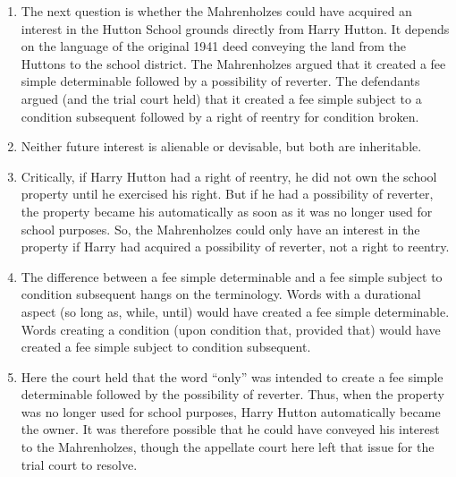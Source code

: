 \begin{enumerate}
    school board is in dispute. It depends on how the court interprets the 
    language in the conveyance. But the only two possible future interests 
    that could have been created are (1) a possibility of reverter or (2) a 
    right of reentry. Neither of these future interests are transferable 
    inter vivos under Illinois law, so ``the trial court correctly ruled that 
    the plaintiffs could not have acquired any interest in that property from 
    the Jacqmains by the deed of October 9, 1959.''\footnote{Casebook p. 227.}
    \item The next question is whether the Mahrenholzes could have acquired an 
    interest in the Hutton School grounds directly from Harry Hutton. It 
    depends on the language of the original 1941 deed conveying the land from 
    the Huttons to the school district. The Mahrenholzes argued that it 
    created a fee simple determinable followed by a possibility of reverter. 
    The defendants argued (and the trial court held) that it created a fee 
    simple subject to a condition subsequent followed by a right of reentry 
    for condition broken.
    \item Neither future interest is alienable or devisable, but both are 
    inheritable.
    \item Critically, if Harry Hutton had a right of reentry, he did not own 
    the school property until he exercised his right. But if he had a 
    possibility of reverter, the property became his automatically as soon as 
    it was no longer used for school purposes. So, the Mahrenholzes could only 
    have an interest in the property if Harry had acquired a possibility of 
    reverter, not a right to reentry.
    \item The difference between a fee simple determinable and a fee simple 
    subject to condition subsequent hangs on the terminology. Words with a 
    durational aspect (so long as, while, until) would have created a fee 
    simple determinable. Words creating a condition (upon condition that, 
    provided that) would have created a fee simple subject to condition 
    subsequent.
    \item Here the court held that the word ``only'' was intended to create a 
    fee simple determinable followed by the possibility of reverter. Thus, 
    when the property was no longer used for school purposes, Harry Hutton 
    automatically became the owner. It was therefore possible that he could 
    have conveyed his interest to the Mahrenholzes, though the appellate court 
    here left that issue for the trial court to resolve.
\end{enumerate}

